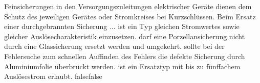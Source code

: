     {Feinsicherungen in den Versorgungszuleitungen elektrischer Geräte dienen dem Schutz des jeweiligen Gerätes oder Stromkreises bei Kurzschlüssen. Beim Ersatz einer durchgebrannten Sicherung ...}
    {ist ein Typ gleichen Stromwertes sowie gleicher Auslösecharakteristik einzusetzen.}
    {darf eine Porzellansicherung nicht durch eine Glassicherung ersetzt werden und umgekehrt.}
    {sollte bei der Fehlersuche zum schnellen Auffinden des Fehlers die defekte Sicherung durch Aluminiumfolie überbrückt werden.}
    {ist ein Ersatztyp mit bis zu fünffachem Auslösestrom erlaubt.}
    {false}{false}
